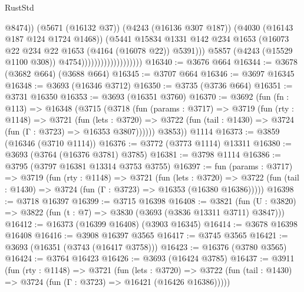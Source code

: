 \begin{lexlean}{RustStd}
\begin{coremodule}
                                                @8474))
                                            (@5671 (@16132 @37))
                                            (@4243 (@16136 @307 @187))
                                            (@4030 (@16143 @187 @124 @1724 @1468))
                                            (@5441
                                              @15834
                                              @1331
                                              @142
                                              @234
                                              @1653
                                              (@16073
                                                @22
                                                @234
                                                @22
                                                @1653
                                                (@4164 (@16078 @22))
                                                @5391)))
                                          @5857
                                          (@4243 (@15529 @1100 @308))
                                          @4754)))))))))))))))))))
@16340 := @3676 @664
@16344 := @3678 (@3682 @664) (@3688 @664)
@16345 := @3707 @664
@16346 := @3697 @16345
@16348 := @3693 (@16346 @3712)
@16350 := @3735 (@3736 @664)
@16351 := @3731 @16350
@16353 := @3693 (@16351 @3760)
@16370 := @3692
    (fun (fn : @113) =>
    @16348
      (@3715
        (@3718
          (fun (params : @3717) =>
          @3719
            (fun (rty : @1148) =>
            @3721
              (fun (lets : @3720) =>
              @3722 (fun (tail : @1430) => @3724 (fun (Γ : @3723) => @16353 @3807))))))
        @3853))
    @1114
@16373 := @3859 (@16346 (@3710 @1114))
@16376 := @3772 (@3773 @1114) @13311
@16380 := @3693 (@3764 (@16376 @3781) @3785)
@16381 := @3798 @1114
@16386 := @3795 (@3797 @16381 @13314 @3753 @3755)
@16397 := fun (params : @3717) =>
  @3719
    (fun (rty : @1148) =>
    @3721
      (fun (lets : @3720) =>
      @3722 (fun (tail : @1430) => @3724 (fun (Γ : @3723) => @16353 (@16380 @16386)))))
@16398 := @3718 @16397
@16399 := @3715 @16398
@16408 := @3821
    (fun (U : @3820) => @3822 (fun (t : @7) => @3830 (@3693 (@3836 @13311 @3711) @3847)))
@16412 := @16373 (@16399 @16408) (@3903 @16345)
@16414 := @3678 @16398 @16408
@16416 := @3908 @16397 @3565
@16417 := @3745 @3565
@16421 := @3693 (@16351 (@3743 (@16417 @3758)))
@16423 := @16376 (@3780 @3565)
@16424 := @3764 @16423
@16426 := @3693 (@16424 @3785)
@16437 := @3911
    (fun (rty : @1148) =>
    @3721
      (fun (lets : @3720) =>
      @3722 (fun (tail : @1430) => @3724 (fun (Γ : @3723) => @16421 (@16426 @16386)))))

\end{coremodule}
\end{lexlean}
